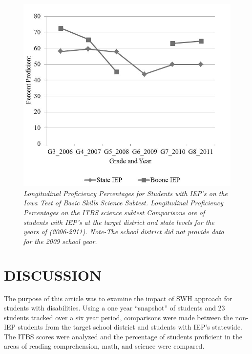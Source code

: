 \documentclass[11.5pt]{sig-alternate} %
\begin{document}
\begin{large}
\begin{figure}[t]
    \includegraphics[width=\columnwidth]{Figure 3.jpg}
 \caption{\textit{Longitudinal Proficiency Percentages for Students with IEP’s on the Iowa Test of Basic Skills Science Subtest. Longitudinal Proficiency Percentages on the ITBS science subtest Comparisons are of students with IEP’s at the target district and state levels for the years of (2006-2011). Note-The school district did not provide data for the 2009 school year.}}
\end{figure}

\section*{DISCUSSION}
The purpose of this article was to examine the impact of SWH approach for students with disabilities. Using a one year “snapshot” of students and 23 students tracked over a six year period, comparisons were made between the non-IEP students from the target school district and students with IEP’s statewide. The ITBS scores were analyzed and the percentage of students proficient in the areas of reading comprehension, math, and science were compared.


\end{large}
\end{document}
